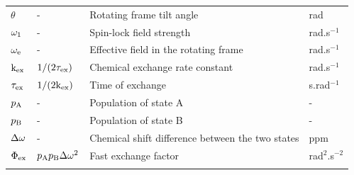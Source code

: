 \begin{table}
\begin{center}
\begin{tabular}{llll}
$\theta$                & -                     & Rotating frame tilt angle                                                     & rad \\
$\omega_1$             & -                     & Spin-lock field strength                                                      & rad.s$^{-1}$ \\
$\omega_\textrm{e}$               & -                     & Effective field in the rotating frame                                         & rad.s$^{-1}$ \\
$\textrm{k}_\textrm{ex}$                  & $1 / (2 \tau_\textrm{ex})$        & Chemical exchange rate constant                                               & rad.s$^{-1}$ \\
$\tau_\textrm{ex}$                  & $1 / (2 \textrm{k}_\textrm{ex})$        & Time of exchange                                                              & s.rad$^{-1}$ \\
$p_\textrm{A}$                   & -                     & Population of state A                                                         & - \\
$p_\textrm{B}$                   & -                     & Population of state B                                                         & - \\
$\Delta\omega$                   & -                     & Chemical shift difference between the two states                              & ppm \\
$\Phi_\textrm{ex}$                & $p_\textrm{A}p_\textrm{B}\Delta\omega^2$         & Fast exchange factor                                                          & rad$^2$.s$^{-2}$ \\
\bottomrule
\label{table: dispersion parameters}
\end{tabular}
\end{center}
\end{table}


